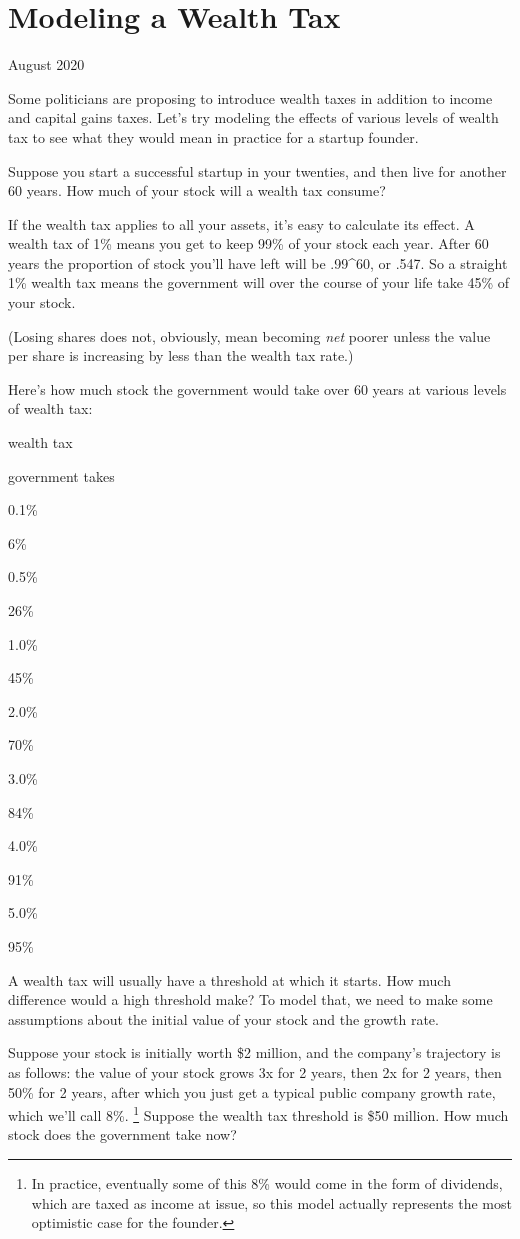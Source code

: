 \chapter{Modeling a Wealth Tax}

August 2020

Some politicians are proposing to introduce wealth taxes in addition to
income and capital gains taxes. Let's try modeling the effects of
various levels of wealth tax to see what they would mean in practice for
a startup founder.

Suppose you start a successful startup in your twenties, and then live
for another 60 years. How much of your stock will a wealth tax consume?

If the wealth tax applies to all your assets, it's easy to calculate its
effect. A wealth tax of 1\% means you get to keep 99\% of your stock
each year. After 60 years the proportion of stock you'll have left will
be .99\^{}60, or .547. So a straight 1\% wealth tax means the government
will over the course of your life take 45\% of your stock.

(Losing shares does not, obviously, mean becoming \emph{net} poorer
unless the value per share is increasing by less than the wealth tax
rate.)

Here's how much stock the government would take over 60 years at various
levels of wealth tax:

wealth tax

government takes

0.1\%

6\%

0.5\%

26\%

1.0\%

45\%

2.0\%

70\%

3.0\%

84\%

4.0\%

91\%

5.0\%

95\%

A wealth tax will usually have a threshold at which it starts. How much
difference would a high threshold make? To model that, we need to make
some assumptions about the initial value of your stock and the growth
rate.

Suppose your stock is initially worth \$2 million, and the company's
trajectory is as follows: the value of your stock grows 3x for 2 years,
then 2x for 2 years, then 50\% for 2 years, after which you just get a
typical public company growth rate, which we'll call 8\%.
\footnote{In practice, eventually some of this 8\% would come in the form
of dividends, which are taxed as income at issue, so this model actually
represents the most optimistic case for the founder.} Suppose the wealth tax threshold is \$50
million. How much stock does the government take now?


